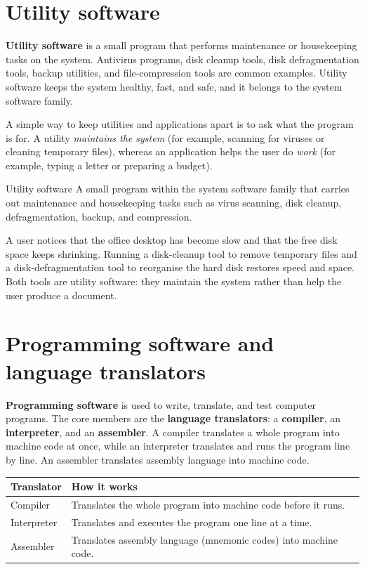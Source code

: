 \section{Utility software}
\textbf{Utility software} is a small program that performs maintenance or
housekeeping tasks on the system. Antivirus programs, disk cleanup tools,
disk defragmentation tools, backup utilities, and file-compression tools are
common examples. Utility software keeps the system healthy, fast, and safe,
and it belongs to the system software family.

A simple way to keep utilities and applications apart is to ask what the
program is for. A utility \emph{maintains the system} (for example, scanning
for viruses or cleaning temporary files), whereas an application helps the
user do \emph{work} (for example, typing a letter or preparing a budget).

\begin{definitionbox}{Utility software}
A small program within the system software family that carries out
maintenance and housekeeping tasks such as virus scanning, disk cleanup,
defragmentation, backup, and compression.
\end{definitionbox}

\begin{example}
A user notices that the office desktop has become slow and that the free disk
space keeps shrinking. Running a disk-cleanup tool to remove temporary files
and a disk-defragmentation tool to reorganise the hard disk restores speed and
space. Both tools are utility software: they maintain the system rather than
help the user produce a document.
\end{example}

\section{Programming software and language translators}
\textbf{Programming software} is used to write, translate, and test computer
programs. The core members are the \textbf{language translators}: a
\textbf{compiler}, an \textbf{interpreter}, and an \textbf{assembler}. A
compiler translates a whole program into machine code at once, while an
interpreter translates and runs the program line by line. An assembler
translates assembly language into machine code.

\begin{center}
\begin{tabular}{p{}p{}}
\toprule
\textbf{Translator} & \textbf{How it works} \\
\midrule
Compiler & Translates the whole program into machine code before it runs. \\
Interpreter & Translates and executes the program one line at a time. \\
Assembler & Translates assembly language (mnemonic codes) into machine code. \\
\bottomrule
\end{tabular}
\end{center}


